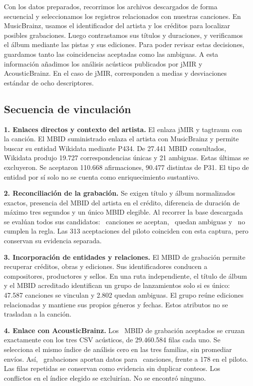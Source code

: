 \documentclass[11pt,a4paper]{article}
\begin{document}
Con los datos preparados, recorrimos los archivos descargados de forma secuencial y seleccionamos los registros relacionados con nuestras canciones. En MusicBrainz, usamos el identificador del artista y los créditos para localizar posibles grabaciones. Luego contrastamos sus títulos y duraciones, y verificamos el álbum mediante las pistas y sus ediciones. Para poder revisar estas decisiones, guardamos tanto las coincidencias aceptadas como las ambiguas. A esta información añadimos los análisis acústicos publicados por jMIR y AcousticBrainz. En el caso de jMIR, corresponden a medias y desviaciones estándar de ocho descriptores.

\subsection{Secuencia de vinculación}
\textbf{1. Enlaces directos y contexto del artista.} El  enlaza jMIR y tagtraum con la canción. El MBID suministrado enlaza el artista con MusicBrainz y permite buscar su entidad Wikidata mediante P434. De 27.441 MBID consultados, Wikidata produjo 19.727 correspondencias únicas y 21 ambiguas. Estas últimas se excluyeron. Se aceptaron 110.668 afirmaciones, 90.477 distintas de P31. El tipo de entidad por sí solo no se cuenta como enriquecimiento sustantivo.

\textbf{2. Reconciliación de la grabación.} Se exigen título y álbum normalizados exactos, presencia del MBID del artista en el crédito, diferencia de duración de máximo tres segundos y un único MBID elegible. Al recorrer la base descargada se evalúan todos sus candidatos: \CancionesMB\ canciones se aceptan, \CancionesMBAmbiguas\ quedan ambiguas y \CancionesMBSinCoincidencia\ no cumplen la regla. Las 313 aceptaciones del piloto coinciden con esta captura, pero conservan su evidencia separada.

\textbf{3. Incorporación de entidades y relaciones.} El MBID de grabación permite recuperar créditos, obras y ediciones. Sus identificadores conducen a compositores, productores y sellos. En una ruta independiente, el título de álbum y el MBID acreditado identifican un grupo de lanzamientos solo si es único: 47.587 canciones se vinculan y 2.802 quedan ambiguas. El grupo reúne ediciones relacionadas y mantiene sus propios géneros y fechas. Estos atributos no se trasladan a la canción.

\textbf{4. Enlace con AcousticBrainz.} Los \GrabacionesMasivas\ MBID de grabación aceptados se cruzan exactamente con los tres CSV acústicos, de 29.460.584 filas cada uno. Se selecciona el mismo índice de análisis cero en las tres familias, sin promediar envíos. Así, \GrabacionesAcousticBrainz\ grabaciones aportan datos para \CancionesAcousticBrainz\ canciones, frente a 178 en el piloto. Las filas repetidas se conservan como evidencia sin duplicar conteos. Los conflictos en el índice elegido se excluirían. No se encontró ninguno.
\end{document}

